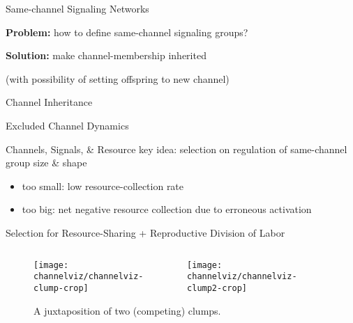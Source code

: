 \begin{frame}{Same-channel Signaling Networks}

\Large
\textbf{Problem:} how to define same-channel signaling groups?

\pause

\textbf{Solution:} make channel-membership inherited

\normalsize
(with possibility of setting offspring to new channel)

\end{frame}

\begin{frame}{Channel Inheritance}
  \vspace{8ex}
  
\end{frame}

\begin{frame}{Excluded Channel Dynamics}
  \vspace{6.6ex}
  
\end{frame}

\begin{frame}{Channels, Signals, \& Resource}
key idea: selection on regulation of same-channel group size \& shape
\pause
\begin{itemize}[<+->]
  \item too small: low resource-collection rate
  \item too big: net negative resource collection due to erroneous activation
\end{itemize}

\end{frame}

\begin{frame}{Selection for Resource-Sharing + Reproductive Division of Labor}

\begin{figure}
\begin{columns}
\begin{column}{0.5\textwidth}
  \texttt{[image: channelviz/channelviz-clump-crop]}
\end{column}
\begin{column}{0.5\textwidth}
  \texttt{[image: channelviz/channelviz-clump2-crop]}
\end{column}
\end{columns}
\caption{A juxtaposition of two (competing) clumps.}
\end{figure}

\end{frame}

